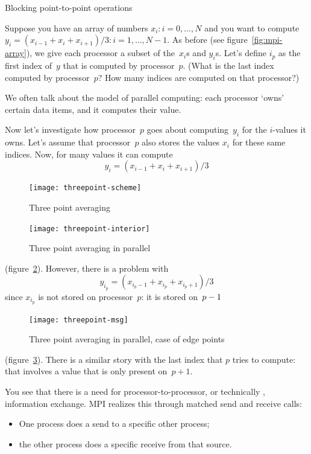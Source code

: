 
 {Blocking point-to-point operations}

Suppose you have an array of numbers $x_i\colon i=0,\ldots,N$
and you want to compute $y_i=(x_{i-1}+x_i+x_{i+1})/3\colon i=1,\ldots,N-1$.
As before (see figure~\ref{fig:mpi-array}), we give each processor
a subset of the~$x_i$s and $y_i$s.
Let's define $i_p$ as the first index of~$y$ that is
computed by processor~$p$. (What is the last index computed by processor~$p$?
How many indices are computed on that processor?)

We often talk about the 
model of parallel computing: each processor `owns' certain data items,
and it computes their value.

Now let's investigate how processor~$p$ goes about computing~$y_i$ for
the $i$-values it owns. Let's assume that processor~$p$ also stores
the values $x_i$ for these same indices.
Now, for many values it can compute
\[ y_{i} = (x_{i-1}+x_{i}+x_{i+1})/3 \]
%
\begin{figure}[ht]
  \texttt{[image: threepoint-scheme]}
  \caption{Three point averaging}
  \label{fig:3pt}
\end{figure}
%
\begin{figure}[ht]
  \texttt{[image: threepoint-interior]}
  \caption{Three point averaging in parallel}
  \label{fig:3pt-interior}
\end{figure}
%
(figure~\ref{fig:3pt-interior}).
However, there is a problem with
\[ y_{i_p} = (x_{i_p-1}+x_{i_p}+x_{i_p+1})/3 \]
since $x_{i_p}$ is not stored on processor~$p$: it is stored on~$p-\nobreak1$
%
\begin{figure}[ht]
  \texttt{[image: threepoint-msg]}
  \caption{Three point averaging in parallel, case of edge points}
  \label{fig:3pt-msg}
\end{figure}
%
(figure~\ref{fig:3pt-msg}).
There is a similar story with the last index that $p$ tries to compute:
that involves a value that is only present on~$p+1$.

You see that there is a need for processor-to-processor, or
technically , information exchange.
MPI realizes this through matched send and receive calls:
\begin{itemize}
\item One process does a send to a specific other process;
\item the other process does a specific receive from that source.
\end{itemize}

